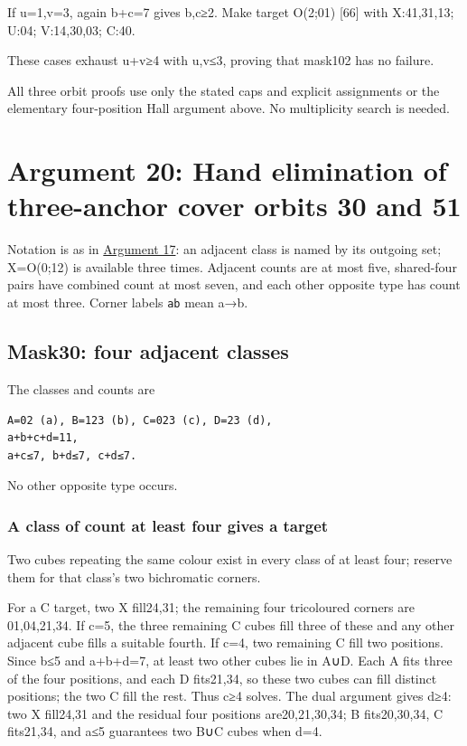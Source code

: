 \documentclass[
  10pt,
]{article}
\begin{document}
If u=1,v=3, again b+c=7 gives b,c≥2. Make target O(2;01)
{[}66{]} with X:41,31,13; U:04; V:14,30,03; C:40.

These cases exhaust u+v≥4 with u,v≤3, proving that mask102 has no
failure.

All three orbit proofs use only the stated caps and explicit assignments
or the elementary four-position Hall argument above. No multiplicity
search is needed.

\hypertarget{arg-20}{%
\section{Argument 20: Hand elimination of three-anchor cover orbits 30
and 51}\label{arg-20}}

Notation is as in \protect\hyperlink{arg-17}{Argument 17}: an adjacent
class is named by its outgoing set; X=O(0;12) is available
three times. Adjacent counts are at most five, shared-four pairs have
combined count at most seven, and each other opposite type has count at
most three. Corner labels \texttt{ab} mean a→b.

\hypertarget{mask30-four-adjacent-classes}{%
\subsection*{Mask30: four adjacent
classes}\label{mask30-four-adjacent-classes}}

The classes and counts are

\begin{verbatim}
A=02 (a), B=123 (b), C=023 (c), D=23 (d),
a+b+c+d=11,
a+c≤7, b+d≤7, c+d≤7.
\end{verbatim}

No other opposite type occurs.

\hypertarget{a-class-of-count-at-least-four-gives-a-target}{%
\subsubsection*{A class of count at least four gives a
target}\label{a-class-of-count-at-least-four-gives-a-target}}

Two cubes repeating the same colour exist in every class of at least
four; reserve them for that class's two bichromatic corners.

For a C target, two X fill24,31; the remaining four tricoloured corners
are 01,04,21,34. If c=5, the three remaining C cubes fill three of these
and any other adjacent cube fills a suitable fourth. If c=4, two
remaining C fill two positions. Since b≤5 and a+b+d=7, at least two
other cubes lie in A∪D. Each A fits three of the four positions, and
each D fits21,34, so these two cubes can fill distinct positions; the
two C fill the rest. Thus c≥4 solves. The dual argument gives d≥4: two X
fill24,31 and the residual four positions are20,21,30,34; B
fits20,30,34, C fits21,34, and a≤5 guarantees two B∪C cubes when d=4.
\end{document}
